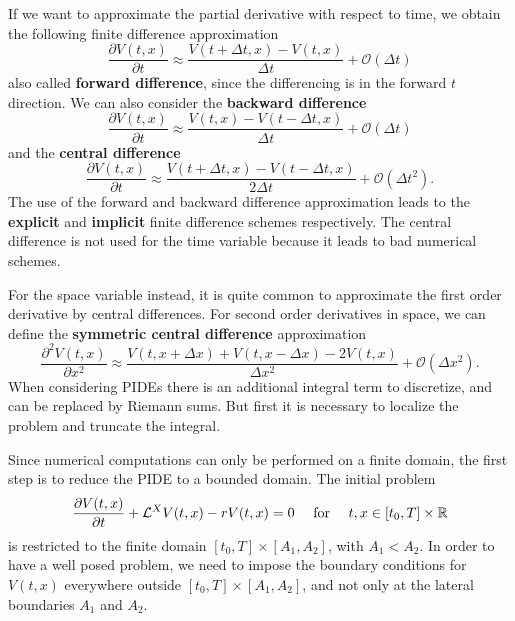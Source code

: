 If we want to approximate the partial derivative with respect to time, we obtain the following finite difference approximation
\begin{equation}
 \frac{\partial V(t,x)}{\partial t} \approx \frac{V(t+\Delta t,x) - V(t,x)}{\Delta t} + \mathcal{O}(\Delta t)
\end{equation}
also called \textbf{forward difference}, since the differencing is in the forward $t$ direction.
We can also consider the \textbf{backward difference}
\begin{equation}
 \frac{\partial V(t,x)}{\partial t} \approx \frac{V(t,x) - V(t-\Delta t,x)}{\Delta t} + \mathcal{O}(\Delta t)
\end{equation}
and the \textbf{central difference}
\begin{equation}
 \frac{\partial V(t,x)}{\partial t} \approx \frac{V(t+\Delta t,x) - V(t-\Delta t,x)}{2 \Delta t} + \mathcal{O}(\Delta t^2).
\end{equation}
The use of the forward and backward difference approximation leads to the \textbf{explicit} and \textbf{implicit} finite difference 
schemes respectively. The central difference is not used for the time variable because it leads to bad numerical schemes.

For the space variable instead, it is quite common to approximate the first order derivative by central differences.
For second order derivatives in space, we can define the \textbf{symmetric central difference} approximation
\begin{equation}
 \frac{\partial^2 V(t,x)}{\partial x^2} \approx \frac{V(t,x+\Delta x) + V(t,x-\Delta x) - 2V(t,x)}{ \Delta x^2} + \mathcal{O}(\Delta x^2).
\end{equation}
When considering PIDEs there is an additional integral term to discretize, 
and can be replaced by Riemann sums. But first it is necessary to localize the problem and truncate the integral.

Since numerical computations can only be performed on a finite domain, the first step is to reduce the PIDE to a bounded domain.
The initial problem
$$  \frac{\partial V(t,x)}{\partial t} + \mathcal{L}^{X} V(t,x) -r V(t,x) = 0  \quad \mbox{ for } \quad t,x \in [t_0,T]\times \mathbb{R} $$
is restricted to the finite domain $ [t_0,T]\times [A_1,A_2]$, with $A_1 < A_2$.
In order to have a well posed problem, we need to impose the boundary conditions for $V(t,x)$ everywhere outside $[t_0,T]\times [A_1,A_2]$, 
and not only at the lateral boundaries $A_1$ and $A_2$.

